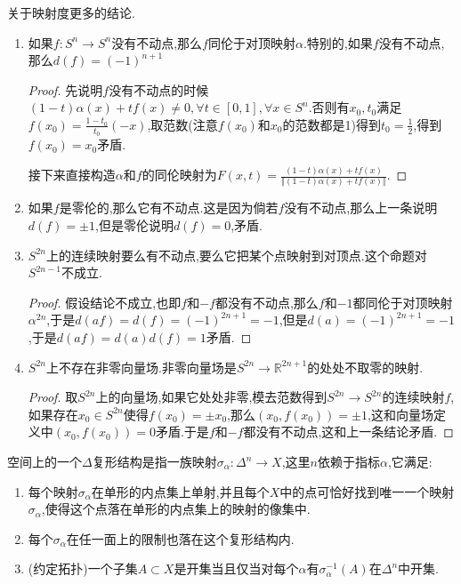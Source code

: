 关于映射度更多的结论.
\begin{enumerate}
	\item 如果$f:S^n\to S^n$没有不动点,那么$f$同伦于对顶映射$\alpha$.特别的,如果$f$没有不动点,那么$d(f)=(-1)^{n+1}$
	\begin{proof}
		
		先说明$f$没有不动点的时候$(1-t)\alpha(x)+tf(x)\not=0,\forall t\in[0,1],\forall x\in S^n$.否则有$x_0,t_0$满足$f(x_0)=\frac{1-t_0}{t_0}(-x)$,取范数(注意$f(x_0)$和$x_0$的范数都是1)得到$t_0=\frac{1}{2}$,得到$f(x_0)=x_0$矛盾.
		
		接下来直接构造$\alpha$和$f$的同伦映射为$F(x,t)=\frac{(1-t)\alpha(x)+tf(x)}{\Vert (1-t)\alpha(x)+tf(x)\Vert}$.
	\end{proof}
	\item 如果$f$是零伦的,那么它有不动点.这是因为倘若$f$没有不动点,那么上一条说明$d(f)=\pm1$,但是零伦说明$d(f)=0$,矛盾.
	\item $S^{2n}$上的连续映射要么有不动点,要么它把某个点映射到对顶点.这个命题对$S^{2n-1}$不成立.
	\begin{proof}
		
		假设结论不成立,也即$f$和$-f$都没有不动点,那么$f$和$-1$都同伦于对顶映射$\alpha^{2n}$,于是$d(af)=d(f)=(-1)^{2n+1}=-1$,但是$d(a)=(-1)^{2n+1}=-1$,于是$d(af)=d(a)d(f)=1$矛盾.
	\end{proof}
	\item $S^{2n}$上不存在非零向量场.非零向量场是$S^{2n}\to\mathbb{R}^{2n+1}$的处处不取零的映射.
	\begin{proof}
		
		取$S^{2n}$上的向量场,如果它处处非零,模去范数得到$S^{2n}\to S^{2n}$的连续映射$f$,如果存在$x_0\in S^{2n}$使得$f(x_0)=\pm x_0$,那么$(x_0,f(x_0))=\pm1$,这和向量场定义中$(x_0,f(x_0))=0$矛盾.于是$f$和$-f$都没有不动点,这和上一条结论矛盾.
	\end{proof}
\end{enumerate}

















空间上的一个$\Delta$复形结构是指一族映射$\sigma_{\alpha}:\Delta^n\to X$,这里$n$依赖于指标$\alpha$,它满足:
\begin{enumerate}
	\item 每个映射$\sigma_{\alpha}$在单形的内点集上单射,并且每个$X$中的点可恰好找到唯一一个映射$\sigma_{\alpha}$,使得这个点落在单形的内点集上的映射的像集中.
	\item 每个$\sigma_{\alpha}$在任一面上的限制也落在这个复形结构内.
	\item (约定拓扑)一个子集$A\subset X$是开集当且仅当对每个$\alpha$有$\sigma_{\alpha}^{-1}(A)$在$\Delta^n$中开集.
\end{enumerate}

